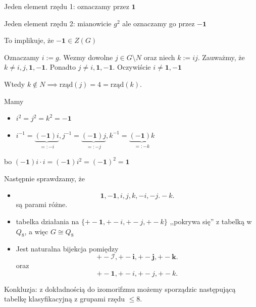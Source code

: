 \begin{enumerate}[label=\arabic*.]
\begin{enumerate}[label=\theenumi\arabic*., ref=\theenumi.\arabic*]
				Jeden element rzędu 1: oznaczamy przez $\mathbf{1}$

				Jeden element rzędu 2: mianowicie $g^2$ ale oznaczamy go przez $-\mathbf{1}$

				\begin{problem}[TODO]
					To implikuje, że $-\mathbf{1}\in Z(G)$
				\end{problem} 

				Oznaczamy $i:=g$. Wezmy dowolne $j\in G\setminus N$ oraz niech $k:= ij$. Zauważmy, że $k\neq i,j, \mathbf{1}, -\mathbf{1}$. Ponadto $j\neq i, \mathbf{1}, -\mathbf{1}$. Oczywiście $i\neq \mathbf{1}, -\mathbf{1}$

				Wtedy $k\not\in N\implies \text{rząd}\left( j \right) = 4 = \text{rząd}\left( k \right) $.

				Mamy 
				\begin{itemize}
					\item $i^2= j^2 = k^2 = -\mathbf{1}$
					\item $i^{-1} = \underbrace{(-\mathbf{1})i }_{=: -i}, j^{-1}=\underbrace{(-\mathbf{1})j}_{=:-j}, k^{-1}= \underbrace{(-\mathbf{1})k}_{=:-k} $
				\end{itemize}
				bo $(-\mathbf{1})i\cdot i = (-\mathbf{1})i^2 = (-\mathbf{1})^2 = \mathbf{1}$

				Następnie sprawdzamy, że 
				\begin{itemize}
					\item 	\[
				\mathbf{1}, -\mathbf{1},i,j,k, -i, -j. -k
				.\] 
				są parami różne.
				\item tabelka działania na $\{+- \mathbf{1}, +-i, +-j, +-k\} $ ,,pokrywa się'' z tabelką w $Q_8$, a więc $G\cong Q_8$
				\item Jest naturalna bijekcja pomiędzy
					\[
					+-\mathcal{I}, +-\mathbf{i}, +-\mathbf{j}, +-\mathbf{k} 
					.\] 
					oraz
					\[
					+-\mathbf{1}, +-i, +-j, +- k
					.\] 

				\end{itemize}
			\end{enumerate}
\end{enumerate}
Konkluzja: z dokładnością do izomorifzmu możemy sporządzic następującą tabelkę klasyfikacyjną z grupami rzędu $\le 8$.


